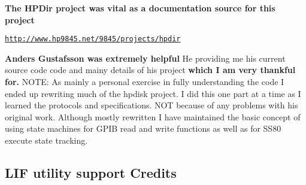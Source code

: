 {\bfseries  The H\+P\+Dir project was vital as a documentation source for this project}
\begin{DoxyItemize}
\item \href{http://www.hp9845.net/9845/projects/hpdir}{\tt http\+://www.\+hp9845.\+net/9845/projects/hpdir}
\end{DoxyItemize}

{\bfseries  Anders Gustafsson was extremely helpful} He providing me his current source code code and mainy details of his project {\bfseries which I am very thankful for.} N\+O\+TE\+: As mainly a personal exercise in fully understanding the code I ended up rewriting much of the hpdisk project. I did this one part at a time as I learned the protocols and specifications. N\+OT because of any problems with his original work. Although mostly rewritten I have maintained the basic concept of using state machines for G\+P\+IB read and write functions as well as for S\+S80 execute state tracking.

\subsection*{L\+IF utility support Credits}

